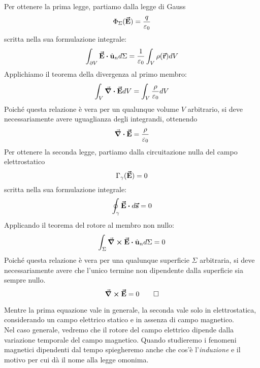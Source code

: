 \begin{demonstration}
	Per ottenere la prima legge, partiamo dalla legge di Gauss
	\begin{equation*}
		\Phi_\Sigma(\vb*{\va{E}})=\frac{q}{\varepsilon_0}
	\end{equation*}
scritta nella sua formulazione integrale:
	\begin{equation*}
		\int_{\partial V}\vba{E}\vdot\vbh{u}_nd\Sigma=\frac{1}{\epsilon_0}\int_{V}\rho(\vba{r})dV
	\end{equation*}
Applichiamo il teorema della divergenza al primo membro:
\begin{equation*}
	\int_V\div{\vb*{\va{E}}}dV=\int_V\frac{\rho}{\varepsilon_0}dV
\end{equation*}
Poiché questa relazione è vera per un qualunque volume $V$ arbitrario, si deve necessariamente avere uguaglianza degli integrandi, ottenendo
\begin{equation*}
	\div{\vb*{\va{E}}}=\frac{\rho}{\varepsilon_0}
\end{equation*}
Per ottenere la seconda legge, partiamo dalla circuitazione nulla del campo elettrostatico
\begin{equation*}
	\Gamma_{\gamma}(\vb*{\va{E}})=0
\end{equation*}
scritta nella sua formulazione integrale:
\begin{equation*}
	\oint_{\gamma}\vba{E}\vdot d\vba{s}=0
\end{equation*}
Applicando il teorema del rotore al membro non nullo:
\begin{equation*}
	\int_{\Sigma}\curl{\vba{E}}\vdot \vbh{u}_nd\Sigma=0
\end{equation*}
Poiché questa relazione è vera per una qualunque superficie $\Sigma$ arbitraria, si deve necessariamente avere che l'unico termine non dipendente dalla superficie sia sempre nullo.
\begin{equation*}
	\curl{\vb*{\va{E}}}=0\qedhere
\end{equation*}
\end{demonstration}
\begin{observe}
	Mentre la prima equazione vale in generale, la seconda vale solo in elettrostatica, considerando un campo elettrico statico e in assenza di campo magnetico.\\
	Nel caso generale, vedremo che il rotore del campo elettrico dipende dalla variazione temporale del campo magnetico. Quando studieremo i fenomeni magnetici dipendenti dal tempo spiegheremo anche che cos'è  l'\textit{induzione} e il motivo per cui dà il nome alla legge omonima.
\end{observe}

